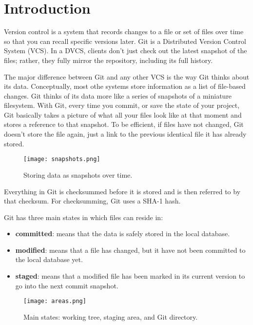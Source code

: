 \section{Introduction}

Version control is a system that records changes to a file or set of files over
time so that you can recall specific versions later. Git is a Distributed
Version Control System (VCS). In a DVCS, clients don't just check out the
latest snapshot of the files; rather, they fully mirror the repository,
including its full history.~\cite{chacon}

The major difference between Git and any other VCS is the way Git thinks about
its data. Conceptually, most othe systems store information as a list of
file-based changes. Git thinks of its data more like a series of snapshots of a
miniature filesystem. With Git, every time you commit, or save the state of your
project, Git basically takes a picture of what all your files look like at that
moment and stores a reference to that snapshot. To be efficient, if files have
not changed, Git doesn't store the file again, just a link to the previous
identical file it has already stored.~\cite{chacon}

\begin{figure}[H]
\centering
\texttt{[image: snapshots.png]}
\caption{Storing data as snapshots over time.}
\end{figure}

Everything in Git is checksummed before it is stored and is then referred to by that checksum.
For checksumming, Git uses a SHA-1 hash.

Git has three main states in which files can reside in:

\begin{itemize}
  \item \textbf{committed}: means that the data is safely stored in the local
  database.
  \item \textbf{modified}: means that a file has changed, but it have not
  been committed to the local database yet.
  \item \textbf{staged}: means that a modified file has been marked in its
  current version to go into the next commit snapshot.
\end{itemize}

\begin{figure}[H]
\centering
\texttt{[image: areas.png]}
\caption{Main states: working tree, staging area, and Git directory.}
\end{figure}

